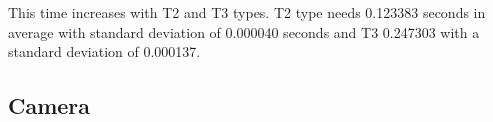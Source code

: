 \documentclass[journal,twoside]{JoPhA}
\begin{document}
This time increases with T2 and T3 types. T2 type needs 0.123383 seconds in average with standard deviation of 0.000040 seconds and  T3  0.247303 with a standard deviation of 0.000137.






% 
% 



\subsection{Camera}
\end{document}
